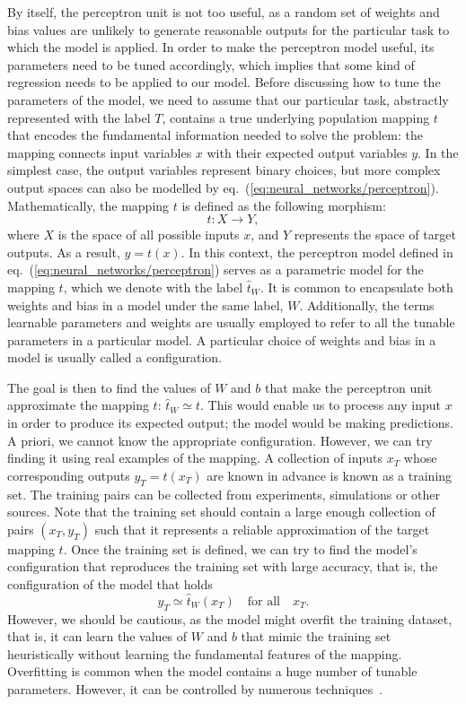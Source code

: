 By itself, the perceptron unit is not too useful, as a random set of weights and bias values are
unlikely to generate reasonable outputs for the particular task to which the model is applied. In
order to make the perceptron model useful, its parameters need to be tuned accordingly, which
implies that some kind of regression needs to be applied to our model. Before discussing how to tune
the parameters of the model, we need to assume that our particular task, abstractly represented with
the label $T$, contains a true underlying population mapping $t$ that encodes the fundamental
information needed to solve the problem: the mapping connects input variables $x$ with their
expected output variables $y$. In the simplest case, the output variables represent binary choices,
but more complex output spaces can also be modelled by eq.~(\ref{eq:neural_networks/perceptron}).
Mathematically, the mapping $t$ is defined as the following morphism:
\begin{equation}
    t: X \to Y,
\end{equation}
where $X$ is the space of all possible inputs $x$, and $Y$ represents the space of target outputs.
As a result, $y = t(x)$. In this context, the perceptron model defined in
eq.~(\ref{eq:neural_networks/perceptron}) serves as a parametric model for the mapping $t$, which we
denote with the label $\hat{t}_W$. It is common to encapsulate both weights and bias in a model
under the same label, $W$. Additionally, the terms learnable parameters and weights are usually
employed to refer to all the tunable parameters in a particular model. A particular choice of
weights and bias in a model is usually called a configuration.

The goal is then to find the values of $W$ and $b$ that make the perceptron unit approximate the
mapping $t$: $\hat{t}_W \simeq t$. This would enable us to process any input $x$ in order to produce
its expected output; the model would be making predictions. A priori, we cannot know the appropriate
configuration. However, we can try finding it using real examples of the mapping. A collection of
inputs $x_T$ whose corresponding outputs $y_T = t(x_T)$ are known in advance is known as a training
set. The training pairs can be collected from experiments, simulations or other sources. Note that
the training set should contain a large enough collection of pairs $(x_T, y_T)$ such that it
represents a reliable approximation of the target mapping $t$. Once the training set is defined, we
can try to find the model's configuration that reproduces the training set with large accuracy, that
is, the configuration of the model that holds
\begin{equation}
    y_T \simeq \hat{t}_W(x_T)\quad \text{for all}\quad x_T.
\end{equation}
However, we should be cautious, as the model might overfit the training dataset, that is, it can
learn the values of $W$ and $b$ that mimic the training set heuristically without learning the
fundamental features of the mapping. Overfitting is common when the model contains a huge number of
tunable parameters. However, it can be controlled by numerous techniques~\cite{ying2019overview}.

